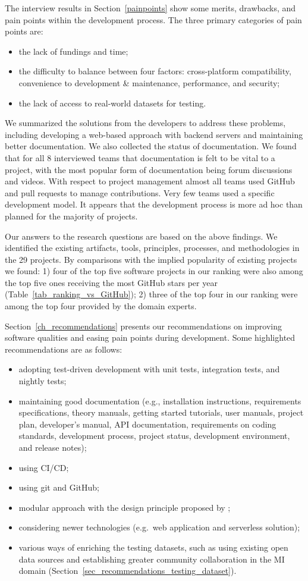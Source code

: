 \documentclass[final, 3p, times, authoryear]{elsarticle}
\begin{document}
The interview results in Section~\ref{painpoints} show some merits, drawbacks,
and pain points within the development process. The three primary categories of
pain points are:
\begin{itemize}
\item the lack of fundings and time;
\item the difficulty to balance between four factors: cross-platform
compatibility, convenience to development \& maintenance, performance, and
security;
\item the lack of access to real-world datasets for testing.
\end{itemize}
We summarized the solutions from the developers to address these problems,
including developing a web-based approach with backend servers and maintaining
better documentation. We also collected the status of documentation.  We found
that for all 8 interviewed teams that documentation is felt to be vital to a
project, with the most popular form of documentation being forum discussions and
videos.  With respect to project management almost all teams used GitHub and
pull requests to manage contributions.  Very few teams used a specific
development model.  It appears that the development process is more ad hoc than
planned for the majority of projects.

Our answers to the research questions are based on the above findings. We
identified the existing artifacts, tools, principles, processes, and
methodologies in the 29 projects. By comparisons with the implied popularity of
existing projects we found: 1) four of the top five software projects in our
ranking were also among the top five ones receiving the most GitHub stars per
year (Table~\ref{tab_ranking_vs_GitHub}); 2) three of the top four in our
ranking were among the top four provided by the domain experts.

Section~\ref{ch_recommendations} presents our recommendations on improving
software qualities and easing pain points during development. Some highlighted
recommendations are as follows:
\begin{itemize}
\item adopting test-driven development with unit tests, integration tests, and
nightly tests;
\item maintaining good documentation (e.g., installation instructions,
requirements specifications, theory manuals, getting started tutorials, user
manuals, project plan, developer’s manual, API documentation, requirements on
coding standards, development process, project status, development environment,
and release notes);
\item using CI/CD;
\item using git and GitHub;
\item modular approach with the design principle proposed by \citet{ParnasEtAl2000};
\item considering newer technologies (e.g.\ web application and serverless
solution);
\item various ways of enriching the testing datasets, such as using existing
open data sources and establishing greater community collaboration in the MI
domain (Section~\ref{sec_recommendations_testing_dataset}).
\end{itemize}
\end{document}
